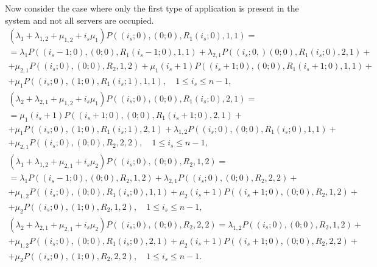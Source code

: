 {%
Now consider the case where only the first type of application is
present in the system and not all servers are occupied.
\begin{multline}
  \left(\lambda_1+\lambda_{1,2}+\mu_{1,2}+i_s\mu_1\right)
  P\left((i_s;0),(0;0),R_1(i_s;0),1,1\right)=\\ = \lambda_1
  P\left((i_s-1;0),(0;0),R_1(i_s-1;0),1,1\right) + \lambda_{2,1}
  P\left((i_s;0,)(0;0),R_1(i_s;0),2,1\right) + \\ + \mu_{2,1}
  P\left((i_s;0),(0;0),R_2,1,2\right)+\mu_1 (i_s+1)
  P\left((i_s+1;0),(0;0),R_1(i_s+1;0),1,1\right) + \\ + \mu_1
  P\left((i_s;0),(1;0),R_1(i_s;1),1,1\right),\quad 1\leqslant
  i_s\leqslant n-1,
\label{eq:2.1}
\end{multline}
\begin{multline}
  \left(\lambda_2+\lambda_{2,1}+\mu_{1,2}+i_s\mu_1\right)
  P\left((i_s;0),(0;0),R_1(i_s;0),2,1\right)=\\ =
  \mu_1 (i_s+1) P\left((i_s+1;0),(0;0),R_1(i_s+1;0),2,1\right) + \\ +\mu_1
  P\left((i_s;0),(1;0),R_1(i_s;1),2,1\right)+ %
  \lambda_{1,2}
  P\left((i_s;0),(0;0),R_1(i_s;0),1,1\right) + \\ +\mu_{2,1}
  P\left((i_s;0),(0;0),R_2,2,2\right), \quad 1\leqslant i_s\leqslant
  n-1,
\label{eq:2.2}
\end{multline}
\begin{multline}
  \left(\lambda_1+\lambda_{1,2}+\mu_{2,1}+i_s\mu_2\right)
  P\left((i_s;0),(0;0),R_2,1,2\right)= \\ = \lambda_1
  P\left((i_s-1;0),(0;0),R_2,1,2\right) + %
  \lambda_{2,1}  P\left((i_s;0),(0;0),R_2,2,2\right) + \\ + \mu_{1,2}
  P\left((i_s;0),(0;0),R_1(i_s;0),1,1\right) + %
  \mu_2 (i_s+1) P\left((i_s+1;0),(0;0),R_2,1,2\right) + \\ + \mu_2
  P\left((i_s;0),(1;0),R_2,1,2\right),\quad 1\leqslant i_s\leqslant
  n-1,
\label{eq:2.3}
\end{multline}
\begin{multline}
  \left(\lambda_2+\lambda_{2,1}+\mu_{2,1}+i_s\mu_2\right)
  P\left((i_s;0),(0;0),R_2,2,2\right)= \lambda_{1,2}
  P\left((i_s;0),(0;0),R_2,1,2\right) + \\ + \mu_{1,2}
  P\left((i_s;0),(0;0),R_1(i_s;0),2,1\right)+ \mu_2 (i_s+1)
  P\left((i_s+1;0),(0;0),R_2,2,2\right) + \\ + \mu_2
  P\left((i_s;0),(1;0),R_2,2,2\right), \quad 1\leqslant i_s\leqslant
  n-1.
\label{eq:2.4}
\end{multline}

}
